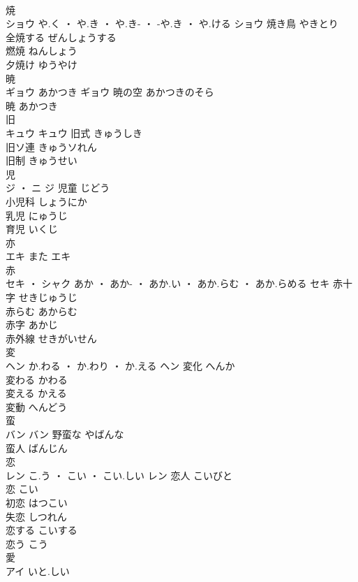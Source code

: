 \documentclass[8pt]{extreport}
\begin{document}
\begin{CJK}{UTF8}{min}
\\	焼	
\\	ショウ	や.く ・ や.き ・ や.き- ・ -や.き ・ や.ける	ショウ	焼き鳥	やきとり	
\\	全焼する	ぜんしょうする	
\\	燃焼	ねんしょう	
\\	夕焼け	ゆうやけ	
\\	暁	
\\	ギョウ	あかつき	ギョウ	暁の空	あかつきのそら	
\\	暁	あかつき	
\\	旧	
\\	キュウ		キュウ	旧式	きゅうしき	
\\	旧ソ連	きゅうソれん	
\\	旧制	きゅうせい	
\\	児	
\\	ジ ・ ニ		ジ	児童	じどう	
\\	小児科	しょうにか	
\\	乳児	にゅうじ	
\\	育児	いくじ	
\\	亦	
\\	エキ	また	エキ																																			
\\	赤	
\\	セキ ・ シャク	あか ・ あか- ・ あか.い ・ あか.らむ ・ あか.らめる	セキ	赤十字	せきじゅうじ	
\\	赤らむ	あからむ	
\\	赤字	あかじ	
\\	赤外線	せきがいせん	
\\	変	
\\	ヘン	か.わる ・ か.わり ・ か.える	ヘン	変化	へんか	
\\	変わる	かわる	
\\	変える	かえる	
\\	変動	へんどう	
\\	蛮	
\\	バン		バン	野蛮な	やばんな	
\\	蛮人	ばんじん	
\\	恋	
\\	レン	こ.う ・ こい ・ こい.しい	レン	恋人	こいびと	
\\	恋	こい	
\\	初恋	はつこい	
\\	失恋	しつれん	
\\	恋する	こいする	
\\	恋う	こう	
\\	愛	
\\	アイ	いと.しい

\end{CJK}
\end{document}
